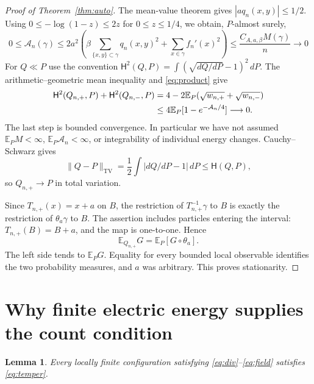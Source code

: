 \documentclass[11pt,reqno]{amsart}
\numberwithin{equation}{section}
\newtheorem{lemma}[theorem]{Lemma}
\theoremstyle{definition}
\theoremstyle{remark}
\newcommand{\E}{\mathbb E}
\newcommand{\1}{\mathbf1}
\newcommand{\dd}{\,d}
\begin{document}
\begin{proof}[Proof of Theorem~\ref{thm:auto}]
The mean-value theorem gives $|a q_n(x,y)|\le1/2$. Using
$0\le-\log(1-z)\le2z$ for $0\le z\le1/4$, we obtain, $P$-almost surely,
\begin{equation}\label{eq:An-small}
0\le\mathcal A_n(\gamma)
\le2a^2\left(\beta\sum_{\{x,y\}\subset\gamma}q_n(x,y)^2
             +\sum_{x\in\gamma}f_n'(x)^2\right)
\le\frac{C_{A,a,\beta}M(\gamma)}n\longrightarrow0
\end{equation}
For $Q\ll P$ use the convention
$\mathsf H^2(Q,P)=\int(\sqrt{dQ/dP}-1)^2\dd P$.
The arithmetic--geometric mean inequality and \eqref{eq:product} give
\begin{align}
\mathsf H^2(Q_{n,+},P)+\mathsf H^2(Q_{n,-},P)
&=4-2\E_P(\sqrt{w_{n,+}}+\sqrt{w_{n,-}})\notag\\
&\le4\E_P[1-e^{-\mathcal A_n/4}]\longrightarrow0.\label{eq:hellinger}
\end{align}
The last step is bounded convergence. In particular we have not
assumed $\E_PM<\infty$, $\E_P\mathcal A_n<\infty$, or integrability
of individual energy changes. Cauchy--Schwarz gives
\[
\|Q-P\|_{\mathrm{TV}}
=\frac12\int|dQ/dP-1|\dd P\le\mathsf H(Q,P),
\]
so $Q_{n,+}\to P$ in total variation.

Since $T_{n,+}(x)=x+a$ on $B$, the restriction of
$T_{n,+}^{-1}\gamma$ to $B$ is exactly the restriction of
$\theta_a\gamma$ to $B$. The assertion includes particles entering the
interval: $T_{n,+}(B)=B+a$, and the map is one-to-one. Hence
\[
\E_{Q_{n,+}}G=\E_P[G\circ\theta_a].
\]
The left side tends to $\E_PG$. Equality for every bounded local
observable identifies the two probability measures, and $a$ was
arbitrary. This proves stationarity.
\end{proof}

\section{Why finite electric energy supplies the count condition}

\begin{lemma}\label{lem:energy-count}
Every locally finite configuration satisfying
\eqref{eq:div}--\eqref{eq:field} satisfies \eqref{eq:temper}.
\end{lemma}
\end{document}

